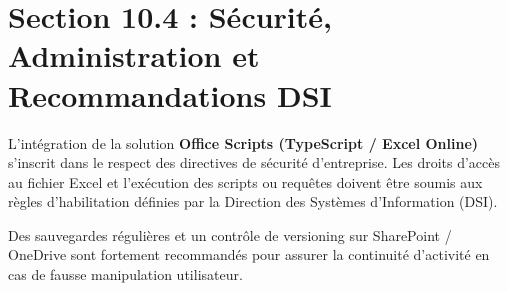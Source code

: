 \documentclass[12pt,a4paper]{report}
\begin{document}
\section{Section 10.4 : Sécurité, Administration et Recommandations DSI}
L'intégration de la solution \textbf{Office Scripts (TypeScript / Excel Online)} s'inscrit dans le respect des directives de sécurité d'entreprise. Les droits d'accès au fichier Excel et l'exécution des scripts ou requêtes doivent être soumis aux règles d'habilitation définies par la Direction des Systèmes d'Information (DSI).

Des sauvegardes régulières et un contrôle de versioning sur SharePoint / OneDrive sont fortement recommandés pour assurer la continuité d'activité en cas de fausse manipulation utilisateur.
\end{document}
